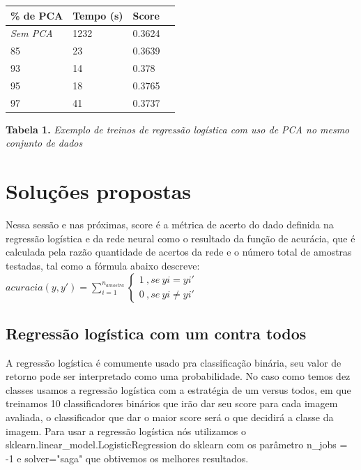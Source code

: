 \documentclass[conference]{IEEEtran}
\begin{document}
\begin{center}

    \begin{tabular}{| l | l | l | l |}
    \hline
    \textbf{\% de PCA} & \textbf{Tempo (s)} & \textbf{Score} \\ \hline
    \textit{Sem PCA} & 1232 & 0.3624 \\ \hline
    85 & 23 & 0.3639 \\ \hline
    93 & 14 & 0.378 \\ \hline
    95 & 18 & 0.3765 \\ \hline
    97 & 41 & 0.3737 \\
    \hline
    \end{tabular}
\newline
    
\textbf{Tabela 1. }\textit{Exemplo de treinos de regressão logística com uso de PCA no mesmo conjunto de dados}

\end{center}

\section{Soluções propostas}
Nessa sessão e nas próximas, score é a métrica de acerto do dado definida na regressão logística\cite{b11, b12} e da  rede neural \cite{b11, b13} como o resultado da função de acurácia\cite{b14}, que é calculada pela razão quantidade de acertos da rede e o número total de amostras testadas, tal como a fórmula abaixo descreve:\\

$acuracia \left (y,y'  \right) = \sum_{i = 1}^{n _{amostra}}{\left \{\begin{matrix}
1 \: ,se \: yi=yi'& \\
0 \: ,se \: yi\neq yi'& 
\end{matrix}\right.}$

\subsection{Regressão logística com um contra todos}
A regressão logística é comumente usado pra classificação binária, seu valor de retorno pode
ser interpretado como uma probabilidade. No caso como temos dez classes usamos a regressão
logística com a estratégia de um versus todos, em que treinamos 10 classificadores binários
que irão dar seu score para cada imagem avaliada, o classificador que dar o maior score 
será o que decidirá a classe da imagem. Para usar a regressão logística nós utilizamos o sklearn.linear\_model.LogisticRegression do sklearn com os parâmetro n\_jobs = -1 e solver="saga" que obtivemos os melhores resultados.
\end{document}
